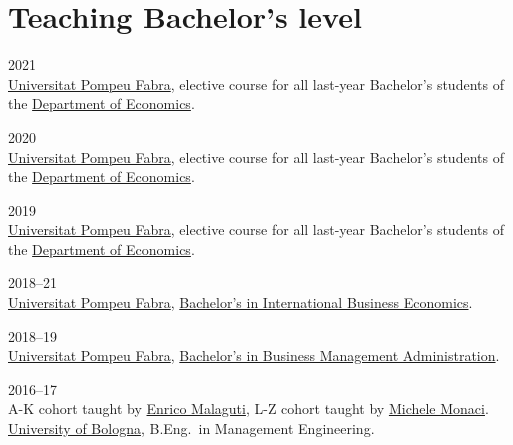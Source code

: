 \section*{Teaching \small{Bachelor's level}}

\begin{paracol}{2}
  2021
\switchcolumn
  \\
  \href{https://www.upf.edu/}{Universitat Pompeu Fabra}, elective course for all last-year Bachelor's students of the \href{https://www.upf.edu/web/econ/}{Department of Economics}.
\end{paracol}

\begin{paracol}{2}
  2020
\switchcolumn
  \\
  \href{https://www.upf.edu/}{Universitat Pompeu Fabra}, elective course for all last-year Bachelor's students of the \href{https://www.upf.edu/web/econ/}{Department of Economics}.
\end{paracol}

\begin{paracol}{2}
  2019
\switchcolumn
  \\
  \href{https://www.upf.edu/}{Universitat Pompeu Fabra}, elective course for all last-year Bachelor's students of the \href{https://www.upf.edu/web/econ/}{Department of Economics}.
\end{paracol}

\begin{paracol}{2}
  2018--21
\switchcolumn
  \\
  \href{https://www.upf.edu/}{Universitat Pompeu Fabra}, \href{https://www.upf.edu/es/web/graus/grau-international-business-economics}{Bachelor's in International Business Economics}.
\end{paracol}

\begin{paracol}{2}
  2018--19
\switchcolumn
  \\
  \href{https://www.upf.edu/}{Universitat Pompeu Fabra}, \href{https://www.upf.edu/es/web/graus/grau-ade}{Bachelor's in Business Management Administration}.
\end{paracol}

\begin{paracol}{2}
  2016--17
\switchcolumn
  \\
  A-K cohort taught by \href{https://scholar.google.com/citations?user=3nD4vYkAAAAJ}{Enrico Malaguti}, L-Z cohort taught by \href{https://scholar.google.com/citations?user=wORMYBMAAAAJ}{Michele Monaci}.\\
  \href{https://www.unibo.it}{University of Bologna}, B.Eng.\ in Management Engineering.
\end{paracol}